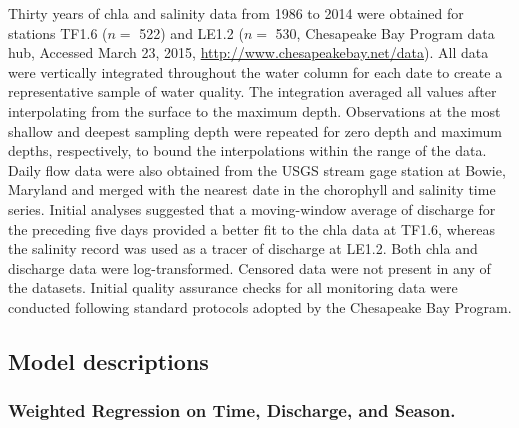\documentclass[letterpaper,12pt,oneside]{article}\usepackage[]{graphicx}\usepackage[]{color}
\begin{document}

Thirty years of \ac{chla} and salinity data from 1986 to 2014 were obtained for stations TF1.6 ($n = $ 522) and LE1.2 ($n =$ 530, Chesapeake Bay Program data hub, Accessed March 23, 2015, \href{http://www.chesapeakebay.net/data}{http://www.chesapeakebay.net/data}).  All data were vertically integrated throughout the water column for each date to create a representative sample of water quality.  The integration averaged all values after interpolating from the surface to the maximum depth. Observations at the most shallow and deepest sampling depth were repeated for zero depth and maximum depths, respectively, to bound the interpolations within the range of the data.  Daily flow data were also obtained from the \ac{USGS} stream gage station at Bowie, Maryland and merged with the nearest date in the chorophyll and salinity time series.  Initial analyses suggested that a moving-window average of discharge for the preceding five days provided a better fit to the \ac{chla} data at TF1.6, whereas the salinity record was used as a tracer of discharge at LE1.2.  Both \ac{chla} and discharge data were log-transformed.  Censored data were not present in any of the datasets.  Initial quality assurance checks for all monitoring data were conducted following standard protocols adopted by the Chesapeake Bay Program.        

\subsection*{Model descriptions}

\subsubsection*{\hspace*{0.25in}Weighted Regression on Time, Discharge, and Season.}
\end{document}
